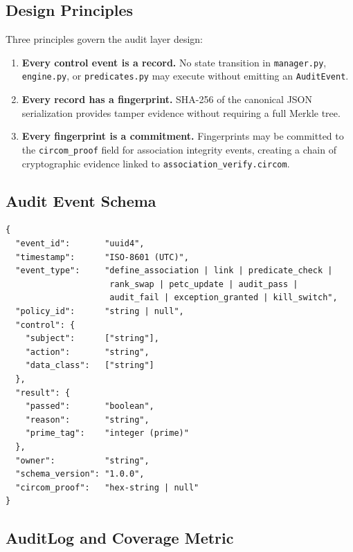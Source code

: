 \documentclass[12pt,letterpaper]{article}
\theoremstyle{definition}
\theoremstyle{remark}
\begin{document}
\subsection{Design Principles}

Three principles govern the audit layer design:
\begin{enumerate}
  \item \textbf{Every control event is a record.} No state transition in
        \texttt{manager.py}, \texttt{engine.py}, or \texttt{predicates.py} may execute
        without emitting an \texttt{AuditEvent}.
  \item \textbf{Every record has a fingerprint.} SHA-256 of the canonical JSON
        serialization provides tamper evidence without requiring a full Merkle tree.
  \item \textbf{Every fingerprint is a commitment.} Fingerprints may be committed to
        the \texttt{circom\_proof} field for association integrity events, creating a
        chain of cryptographic evidence linked to \texttt{association\_verify.circom}.
\end{enumerate}

\subsection{Audit Event Schema}

\begin{noteboxtc}
\begin{lstlisting}[style=jsonlstyle, caption={AuditEvent JSON schema (schema version 1.0.0)}, label={lst:auditevent}]
{
  "event_id":       "uuid4",
  "timestamp":      "ISO-8601 (UTC)",
  "event_type":     "define_association | link | predicate_check |
                     rank_swap | petc_update | audit_pass |
                     audit_fail | exception_granted | kill_switch",
  "policy_id":      "string | null",
  "control": {
    "subject":      ["string"],
    "action":       "string",
    "data_class":   ["string"]
  },
  "result": {
    "passed":       "boolean",
    "reason":       "string",
    "prime_tag":    "integer (prime)"
  },
  "owner":          "string",
  "schema_version": "1.0.0",
  "circom_proof":   "hex-string | null"
}
\end{lstlisting}
\end{noteboxtc}

\subsection{AuditLog and Coverage Metric}
\end{document}
